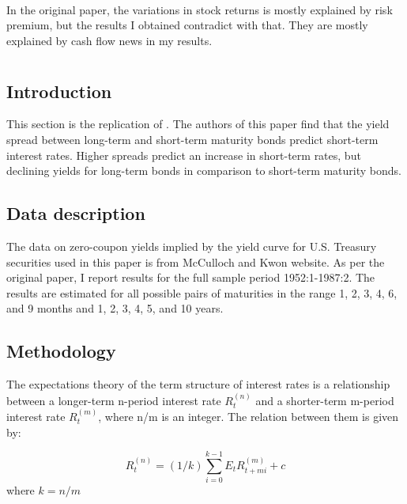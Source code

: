 \documentclass[11pt]{article}
\begin{document}
\paragraph{} In the original paper, the variations in stock returns is mostly explained by risk premium, but the results I obtained contradict with that. They are mostly explained by cash flow news in my results.
\clearpage



\section{\cite{campbell1991yield}} \label{sec:CS}

\subsection{Introduction}
This section is the replication of \cite{campbell1991yield}. The authors of this paper find that the yield spread between long-term and short-term maturity bonds predict short-term interest rates. Higher spreads predict an increase in short-term rates, but declining yields for long-term bonds in comparison to short-term maturity bonds.

\subsection{Data description}
The data on zero-coupon yields implied by the yield curve for U.S. Treasury securities used in this paper is from McCulloch and Kwon website. As per the original paper, I report results for the full sample period 1952:1-1987:2. The results are estimated for all possible pairs of maturities in the range 1, 2, 3, 4, 6, and 9 months and 1, 2, 3, 4, 5, and 10 years.  

\subsection{Methodology}
The expectations theory of the term structure of interest rates is a relationship between
a longer-term n-period interest rate $R_{t}^{(n)}$ and a shorter-term m-period interest rate $R_{t}^{(m)}$, where n/m is an integer. The relation between them is given by:

\begin{equation} \label{eq:CS1}
R_{t}^{(n)}=(1 / k) \sum_{i=0}^{k-1} E_{t} R_{t+m i}^{(m)}+c
\end{equation}
where $k=n/m$
\end{document}
